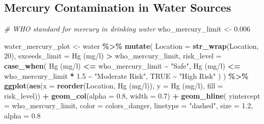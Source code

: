 \documentclass[
]{article}
\newenvironment{Shaded}{\begin{snugshade}}{\end{snugshade}}
\newcommand{\AttributeTok}[1]{\textcolor[rgb]{0.13,0.29,0.53}{#1}}
\newcommand{\CommentTok}[1]{\textcolor[rgb]{0.56,0.35,0.01}{\textit{#1}}}
\newcommand{\ConstantTok}[1]{\textcolor[rgb]{0.56,0.35,0.01}{#1}}
\newcommand{\DecValTok}[1]{\textcolor[rgb]{0.00,0.00,0.81}{#1}}
\newcommand{\FloatTok}[1]{\textcolor[rgb]{0.00,0.00,0.81}{#1}}
\newcommand{\FunctionTok}[1]{\textcolor[rgb]{0.13,0.29,0.53}{\textbf{#1}}}
\newcommand{\NormalTok}[1]{#1}
\newcommand{\OtherTok}[1]{\textcolor[rgb]{0.56,0.35,0.01}{#1}}
\newcommand{\SpecialCharTok}[1]{\textcolor[rgb]{0.81,0.36,0.00}{\textbf{#1}}}
\newcommand{\StringTok}[1]{\textcolor[rgb]{0.31,0.60,0.02}{#1}}
\begin{document}
\subsection{Mercury Contamination in Water
Sources}\label{mercury-contamination-in-water-sources}

\begin{Shaded}
\begin{Highlighting}[]
\CommentTok{\# WHO standard for mercury in drinking water}
\NormalTok{who\_mercury\_limit }\OtherTok{\textless{}{-}} \FloatTok{0.006}

\NormalTok{water\_mercury\_plot }\OtherTok{\textless{}{-}}\NormalTok{ water }\SpecialCharTok{\%\textgreater{}\%}
  \FunctionTok{mutate}\NormalTok{(}
    \AttributeTok{Location =} \FunctionTok{str\_wrap}\NormalTok{(Location, }\DecValTok{20}\NormalTok{),}
    \AttributeTok{exceeds\_limit =} \StringTok{\textasciigrave{}}\AttributeTok{Hg (mg/l)}\StringTok{\textasciigrave{}} \SpecialCharTok{\textgreater{}}\NormalTok{ who\_mercury\_limit,}
    \AttributeTok{risk\_level =} \FunctionTok{case\_when}\NormalTok{(}
      \StringTok{\textasciigrave{}}\AttributeTok{Hg (mg/l)}\StringTok{\textasciigrave{}} \SpecialCharTok{\textless{}=}\NormalTok{ who\_mercury\_limit }\SpecialCharTok{\textasciitilde{}} \StringTok{"Safe"}\NormalTok{,}
      \StringTok{\textasciigrave{}}\AttributeTok{Hg (mg/l)}\StringTok{\textasciigrave{}} \SpecialCharTok{\textless{}=}\NormalTok{ who\_mercury\_limit }\SpecialCharTok{*} \FloatTok{1.5} \SpecialCharTok{\textasciitilde{}} \StringTok{"Moderate Risk"}\NormalTok{,}
      \ConstantTok{TRUE} \SpecialCharTok{\textasciitilde{}} \StringTok{"High Risk"}
\NormalTok{    )}
\NormalTok{  ) }\SpecialCharTok{\%\textgreater{}\%}
  \FunctionTok{ggplot}\NormalTok{(}\FunctionTok{aes}\NormalTok{(}\AttributeTok{x =} \FunctionTok{reorder}\NormalTok{(Location, }\StringTok{\textasciigrave{}}\AttributeTok{Hg (mg/l)}\StringTok{\textasciigrave{}}\NormalTok{), }\AttributeTok{y =} \StringTok{\textasciigrave{}}\AttributeTok{Hg (mg/l)}\StringTok{\textasciigrave{}}\NormalTok{, }\AttributeTok{fill =}\NormalTok{ risk\_level)) }\SpecialCharTok{+}
  \FunctionTok{geom\_col}\NormalTok{(}\AttributeTok{alpha =} \FloatTok{0.8}\NormalTok{, }\AttributeTok{width =} \FloatTok{0.7}\NormalTok{) }\SpecialCharTok{+}
  \FunctionTok{geom\_hline}\NormalTok{(}
    \AttributeTok{yintercept =}\NormalTok{ who\_mercury\_limit, }
    \AttributeTok{color =}\NormalTok{ colors\_danger, }
    \AttributeTok{linetype =} \StringTok{"dashed"}\NormalTok{, }
    \AttributeTok{size =} \FloatTok{1.2}\NormalTok{,}
    \AttributeTok{alpha =} \FloatTok{0.8}

\end{Highlighting}
\end{Shaded}
\end{document}
